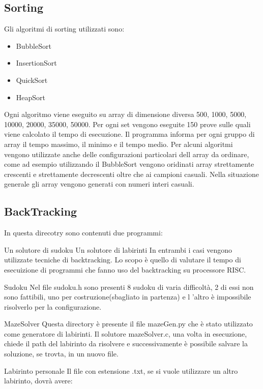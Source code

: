 \documentclass[12pt,a4paper]{report}
\begin{document}
\subsection{Sorting}
Gli algoritmi di sorting utilizzati sono:
\begin{itemize}
	\item BubbleSort
	\item InsertionSort
	\item QuickSort
	\item HeapSort
\end{itemize}

Ogni algoritmo viene eseguito su array di dimensione diversa 500, 1000, 5000, 10000, 20000, 35000, 50000. Per ogni set vengono eseguite 150 prove sulle quali viene calcolato il tempo di esecuzione. Il programma informa per ogni gruppo di array il tempo massimo, il minimo e il tempo medio. Per alcuni algoritmi vengono utilizzate anche delle configurazioni particolari dell array da ordinare, come ad esempio utilizzando il BubbleSort vengono oridinati array strettamente crescenti e strettamente decrescenti oltre che ai campioni casuali. Nella situazione generale gli array vengono generati con numeri interi casuali.


\subsection{BackTracking}
In questa direcotry sono contenuti due programmi:

Un solutore di sudoku
Un solutore di labirinti
In entrambi i casi vengono utilizzate tecniche di backtracking. Lo scopo è quello di valutare il tempo di esecuizione di programmi che fanno uso del backtracking su processore RISC.

Sudoku
Nel file sudoku.h sono presenti 8 sudoku di varia difficoltà, 2 di essi non sono fattibili, uno per costruzione(sbagliato in partenza) e l 'altro è impossibile risolverlo per la configurazione.

MazeSolver
Questa directory è presente il file mazeGen.py che è stato utilizzato come generatore di labirinti. Il solutore mazeSolver.c, una volta in esecuzione, chiede il path del labirinto da risolvere e successivamente è possibile salvare la soluzione, se trovta, in un nuovo file.

Labirinto personale
Il file con estensione .txt, se si vuole utilizzare un altro labirinto, dovrà avere:
\end{document}
